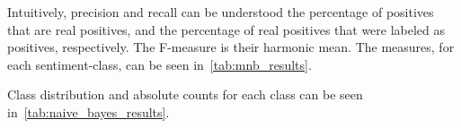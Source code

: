 Intuitively, precision and recall can be understood the percentage of positives that are real positives,
and the percentage of real positives that were labeled as positives, respectively.
The F-measure is their harmonic mean.
The measures, for each sentiment-class, can be seen in~\ref{tab:mnb_results}.

\begin{table}
    \caption{Sentiment classification results using multinomial naive Bayes}
    \label{tab:mnb_results}
\end{table}

Class distribution and absolute counts for each class can be seen in~\ref{tab:naive_bayes_results}.

\begin{table}
    \caption{Sentiment classification using multinomial naive Bayes}
    \label{tab:naive_bayes_results}
\end{table}

